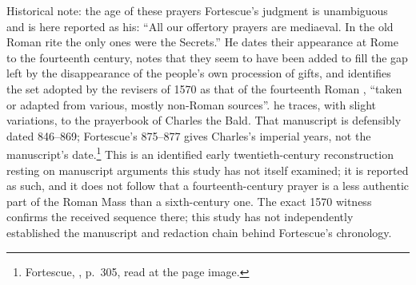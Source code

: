 \begin{witnesscard}{Historical note: the age of these prayers}
Fortescue's judgment is unambiguous and is here reported as his: ``All our
offertory prayers are mediaeval. In the old Roman rite the only ones were the
Secrets.'' He dates their appearance at Rome to the fourteenth century, notes
that they seem to have been added to fill the gap left by the disappearance of
the people's own procession of gifts, and identifies the set adopted by the
revisers of 1570 as that of the fourteenth Roman , ``taken or adapted
from various, mostly non-Roman sources''.  he
traces, with slight variations, to the prayerbook of Charles the Bald. That
manuscript is defensibly dated 846--869; Fortescue's 875--877 gives Charles's
imperial years, not the manuscript's date.\footnote{Fortescue, , p.~305, read at the page image.} This is an identified early
twentieth-century reconstruction resting on
manuscript arguments this study has not itself examined; it is reported as
such, and it does not follow that a fourteenth-century prayer is a less
authentic part of the Roman Mass than a sixth-century one. The exact 1570
witness confirms the received sequence there; this study has not independently
established the manuscript and redaction chain behind Fortescue's chronology.
\end{witnesscard}
